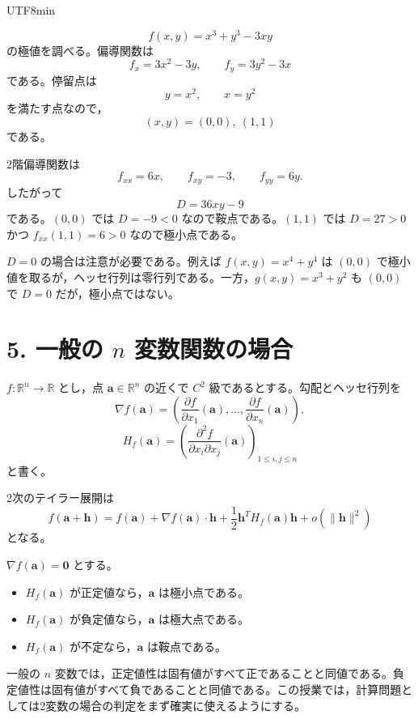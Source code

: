 \documentclass[a4paper,12pt]{article}
\newcommand{\R}{\mathbb{R}}
\begin{document}
\begin{CJK}{UTF8}{min}
\begin{example}
$$
f(x,y)=x^3+y^3-3xy
$$
の極値を調べる。偏導関数は
$$
f_x=3x^2-3y,\qquad f_y=3y^2-3x
$$
である。停留点は
$$
y=x^2,\qquad x=y^2
$$
を満たす点なので，
$$
(x,y)=(0,0),\ (1,1)
$$
である。

2階偏導関数は
$$
f_{xx}=6x,\qquad f_{xy}=-3,\qquad f_{yy}=6y.
$$
したがって
$$
D=36xy-9
$$
である。$(0,0)$ では $D=-9<0$ なので鞍点である。$(1,1)$ では $D=27>0$ かつ $f_{xx}(1,1)=6>0$ なので極小点である。
\end{example}

\begin{remark}
$D=0$ の場合は注意が必要である。例えば $f(x,y)=x^4+y^4$ は $(0,0)$ で極小値を取るが，ヘッセ行列は零行列である。一方，$g(x,y)=x^3+y^2$ も $(0,0)$ で $D=0$ だが，極小点ではない。
\end{remark}

\section*{5. 一般の $n$ 変数関数の場合}

$f:\R^n\to\R$ とし，点 $\boldsymbol{a}\in\R^n$ の近くで $C^2$ 級であるとする。勾配とヘッセ行列を
$$
\nabla f(\boldsymbol{a})
=\left(\frac{\partial f}{\partial x_1}(\boldsymbol{a}),\ldots,
\frac{\partial f}{\partial x_n}(\boldsymbol{a})\right),
$$
$$
H_f(\boldsymbol{a})
=\left(
\frac{\partial^2 f}{\partial x_i\partial x_j}(\boldsymbol{a})
\right)_{1\le i,j\le n}
$$
と書く。

2次のテイラー展開は
$$
f(\boldsymbol{a}+\boldsymbol{h})
=f(\boldsymbol{a})
+\nabla f(\boldsymbol{a})\cdot\boldsymbol{h}
+\frac12\boldsymbol{h}^{T}H_f(\boldsymbol{a})\boldsymbol{h}
+o(\|\boldsymbol{h}\|^2)
$$
となる。

\begin{theorem}[一般の場合の極値判定]
$\nabla f(\boldsymbol{a})=\boldsymbol{0}$ とする。
\begin{itemize}
\item $H_f(\boldsymbol{a})$ が正定値なら，$\boldsymbol{a}$ は極小点である。
\item $H_f(\boldsymbol{a})$ が負定値なら，$\boldsymbol{a}$ は極大点である。
\item $H_f(\boldsymbol{a})$ が不定なら，$\boldsymbol{a}$ は鞍点である。
\end{itemize}
\end{theorem}

\begin{remark}
一般の $n$ 変数では，正定値性は固有値がすべて正であることと同値である。負定値性は固有値がすべて負であることと同値である。この授業では，計算問題としては2変数の場合の判定をまず確実に使えるようにする。
\end{remark}


\end{CJK}
\end{document}
